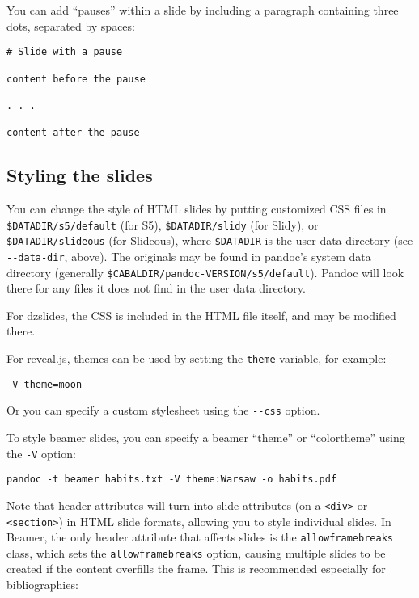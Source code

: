 \documentclass[]{article}
\begin{document}
You can add ``pauses'' within a slide by including a paragraph
containing three dots, separated by spaces:

\begin{verbatim}
# Slide with a pause

content before the pause

. . .

content after the pause
\end{verbatim}

\subsection{Styling the slides}

You can change the style of HTML slides by putting customized CSS files
in \texttt{\$DATADIR/s5/default} (for S5), \texttt{\$DATADIR/slidy} (for
Slidy), or \texttt{\$DATADIR/slideous} (for Slideous), where
\texttt{\$DATADIR} is the user data directory (see
\texttt{-{}-data-dir}, above). The originals may be found in pandoc's
system data directory (generally
\texttt{\$CABALDIR/pandoc-VERSION/s5/default}). Pandoc will look there
for any files it does not find in the user data directory.

For dzslides, the CSS is included in the HTML file itself, and may be
modified there.

For reveal.js, themes can be used by setting the \texttt{theme}
variable, for example:

\begin{verbatim}
-V theme=moon
\end{verbatim}

Or you can specify a custom stylesheet using the \texttt{-{}-css}
option.

To style beamer slides, you can specify a beamer ``theme'' or
``colortheme'' using the \texttt{-V} option:

\begin{verbatim}
pandoc -t beamer habits.txt -V theme:Warsaw -o habits.pdf
\end{verbatim}

Note that header attributes will turn into slide attributes (on a
\texttt{\textless{}div\textgreater{}} or
\texttt{\textless{}section\textgreater{}}) in HTML slide formats,
allowing you to style individual slides. In Beamer, the only header
attribute that affects slides is the \texttt{allowframebreaks} class,
which sets the \texttt{allowframebreaks} option, causing multiple slides
to be created if the content overfills the frame. This is recommended
especially for bibliographies:
\end{document}
